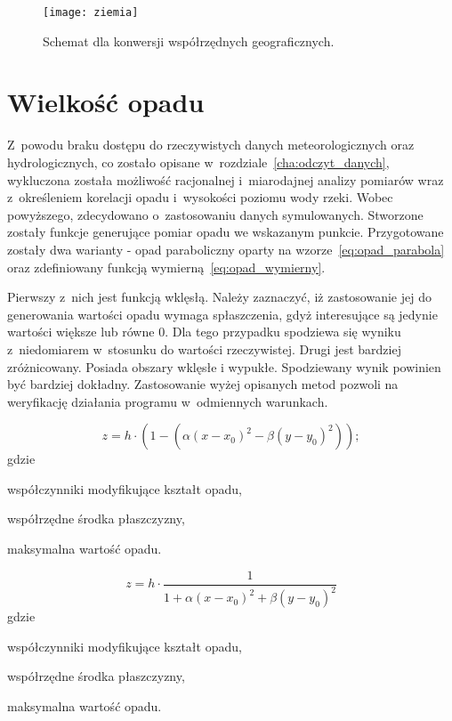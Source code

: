 \begin{figure}[!ht]
	\centering
	\texttt{[image: ziemia]}
	\caption{Schemat dla konwersji współrzędnych geograficznych.}
	\label{fig:ziemia}
\end{figure}

\section{Wielkość opadu}
Z~powodu braku dostępu do rzeczywistych danych meteorologicznych oraz hydrologicznych, co zostało opisane w~rozdziale~\ref{cha:odczyt_danych}, wykluczona została możliwość racjonalnej i~miarodajnej analizy pomiarów wraz z~określeniem korelacji opadu i~wysokości poziomu wody rzeki. Wobec powyższego, zdecydowano o~zastosowaniu danych symulowanych. Stworzone zostały funkcje generujące pomiar opadu we wskazanym punkcie. Przygotowane zostały dwa warianty - opad paraboliczny oparty na wzorze~\ref{eq:opad_parabola} oraz zdefiniowany funkcją wymierną~\ref{eq:opad_wymierny}.


Pierwszy z~nich jest funkcją wklęsłą. Należy zaznaczyć, iż zastosowanie jej do generowania wartości opadu wymaga spłaszczenia, gdyż interesujące są jedynie wartości większe lub równe 0. Dla tego przypadku spodziewa się wyniku z~niedomiarem w~stosunku do wartości rzeczywistej. Drugi jest bardziej zróżnicowany. Posiada obszary wklęsłe i wypukłe. Spodziewany wynik powinien być bardziej dokładny. Zastosowanie wyżej opisanych metod pozwoli na weryfikację działania programu w~odmiennych warunkach.

\begin{equation}
z = h \cdot (1 - (\alpha (x - x_0)^2 - \beta (y - y_0)^2) );
\label{eq:opad_parabola}
\end{equation}
gdzie
\begin{description}[leftmargin=3cm, itemsep=0cm, labelsep=0cm]
	\item[$\alpha, \beta$] współczynniki modyfikujące kształt opadu,
	\item[$x_0, y_0$] współrzędne środka płaszczyzny,
	\item[$h$] maksymalna wartość opadu.
\end{description}

\begin{equation}
z = h \cdot \frac{1}{1 + \alpha (x-x_0)^2 + \beta (y-y_0)^2}
\label{eq:opad_wymierny}
\end{equation}
gdzie
\begin{description}[leftmargin=3cm, itemsep=0cm, labelsep=0cm]
	\item[$\alpha, \beta$] współczynniki modyfikujące kształt opadu,
	\item[$x_0, y_0$] współrzędne środka płaszczyzny,
	\item[$h$] maksymalna wartość opadu.
\end{description}

